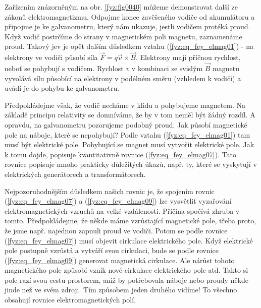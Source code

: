     Zařízením znázorněným na obr. \ref{fyz:fig0040} můžeme demonstrovat další ze zákonů   
    elektromagnetizmu. Odpojme konce zavěšeného vodiče od akumulátoru a připojme je ke 
    galvanometru, který nám ukazuje, jestli vodičem protéká proud. Když vodič postrčíme do strany v 
    magnetickém poli magnetu, zaznamenáme proud. Takový jev je opět dalším důsledkem vztahu 
    (\ref{fyz:eq_fey_elmag01}) - na elektrony ve vodiči působí síla \(\vec{F}=q\vec{v} 
    \times\vec{B}\). Elektrony mají příčnou rychlost, neboť se pohybují s vodičem. Rychlost \(v\) v 
    kombinaci se svislým \(\vec{B}\) magnetu vyvolává sílu působící na elektrony v podélném směru 
    (vzhledem k vodiči) a uvádí je do pohybu ke galvanometru.      

    Předpokládejme však, že vodič necháme v klidu a pohybujeme magnetem. Na základě principu 
    relativity se domníváme, že by v tom neměl být žádný rozdíl. A opravdu, na galvanometru 
    pozorujeme podobný proud. Jak působí magnetické pole na náboje, které se nepohybují? Podle 
    vztahu (\ref{fyz:eq_fey_elmag01}) tam musí být elektrické pole. Pohybující se magnet musí 
    vytvořit elektrické pole. Jak k tomu dojde, popisuje kvantitativně rovnice 
    (\ref{fyz:eq_fey_elmag07}). Tato rovnice popisuje mnoho prakticky důležitých úkazů, např. ty, 
    které se vyskytují v elektrických generátorech a transformátorech.
    
    Nejpozoruhodnějším důsledkem našich rovnic je, že spojením rovnic (\ref{fyz:eq_fey_elmag07}) a
    (\ref{fyz:eq_fey_elmag09}) lze vysvětlit vyzařování elektromagnetických vzruchů na velké 
    vzdálenosti. Příčina spočívá zhruba v tomto. Předpokládejme, že někde máme vzrůstající 
    magnetické pole, třeba proto, že jsme např. najednou zapnuli proud ve vodiči. Potom se podle 
    rovnice (\ref{fyz:eq_fey_elmag07}) musí objevit cirkulace elektrického pole. Když elektrické 
    pole postupně vzrůstá a vytváří svou cirkulaci, bude se podle rovnice 
    (\ref{fyz:eq_fey_elmag09}) generovat magnetická cirkulace. Ale nárůst tohoto magnetického pole 
    způsobí vznik nové cirkulace elektrického pole atd. Takto si pole razí svou cestu prostorem, 
    aniž by potřebovala náboje nebo proudy někde jinde než ve svém zdroji. Tím způsobem jeden 
    druhého vidíme! To všechno obsahují rovnice elektromagnetických polí.
       
   
